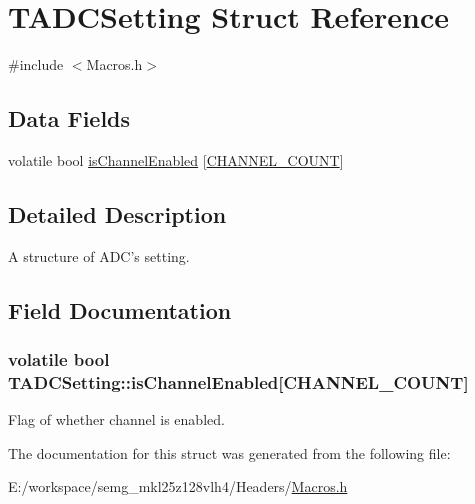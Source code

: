 \hypertarget{struct_t_a_d_c_setting}{\section{T\-A\-D\-C\-Setting Struct Reference}
\label{struct_t_a_d_c_setting}
}


{\ttfamily \#include $<$Macros.\-h$>$}

\subsection*{Data Fields}
\begin{DoxyCompactItemize}
\item 
volatile bool \hyperlink{struct_t_a_d_c_setting_a4407acb36d568a7b315dd10fc85c0a8c}{is\-Channel\-Enabled} \mbox{[}\hyperlink{group___a_d_c_const_ga29e42927003b0aa647ee45965f4ccb07}{C\-H\-A\-N\-N\-E\-L\-\_\-\-C\-O\-U\-N\-T}\mbox{]}
\end{DoxyCompactItemize}


\subsection{Detailed Description}
A structure of A\-D\-C's setting. 

\subsection{Field Documentation}
\hypertarget{struct_t_a_d_c_setting_a4407acb36d568a7b315dd10fc85c0a8c}{
\subsubsection[{is\-Channel\-Enabled}]{\setlength{\rightskip}{0pt plus 5cm}volatile bool T\-A\-D\-C\-Setting\-::is\-Channel\-Enabled\mbox{[}{\bf C\-H\-A\-N\-N\-E\-L\-\_\-\-C\-O\-U\-N\-T}\mbox{]}}}\label{struct_t_a_d_c_setting_a4407acb36d568a7b315dd10fc85c0a8c}
Flag of whether channel is enabled. 

The documentation for this struct was generated from the following file\-:\begin{DoxyCompactItemize}
\item 
E\-:/workspace/semg\-\_\-mkl25z128vlh4/\-Headers/\hyperlink{_macros_8h}{Macros.\-h}\end{DoxyCompactItemize}
